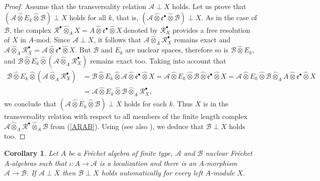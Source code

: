 \documentclass[12pt]{amsart}%
\theoremstyle{plain}
\newtheorem{corollary}{Corollary}
\numberwithin{equation}{section}
\numberwithin{equation}{section}
\numberwithin{theorem}{section}
\numberwithin{lemma}{section}
\numberwithin{remark}{section}
\numberwithin{example}{section}
\numberwithin{proposition}{section}
\numberwithin{definition}{section}
\numberwithin{corollary}{section}
\begin{document}
\begin{proof}
Assume that the transversality relation $\mathcal{A}\perp X$ holds. Let us
prove that $\left(  \mathcal{A}\widehat{\otimes}E_{k}\widehat{\otimes
}\mathcal{B}\right)  \perp X$ holds for all $k$, that is, $\left(
\mathcal{A}\widehat{\otimes}\mathfrak{e}^{\bullet}\widehat{\otimes}%
\mathcal{B}\right)  \perp X$. As in the case of $\mathcal{B}$, the complex
$\mathcal{R}^{\bullet}\widehat{\otimes}_{A}X=A\widehat{\otimes}\mathfrak{e}%
^{\bullet}\widehat{\otimes}X\mathcal{\ }$denoted by $\mathcal{R}_{X}^{\bullet
}$ provides a free resolution of $X$ in $A$-mod. Since $\mathcal{A}\perp X$,
it follows that $\mathcal{A}\widehat{\otimes}_{A}\mathcal{R}_{X}^{\bullet}$
remains exact and $\mathcal{A}\widehat{\otimes}_{A}\mathcal{R}_{X}^{\bullet
}=\mathcal{A}\widehat{\otimes}\mathfrak{e}^{\bullet}\widehat{\otimes}X$. But
$\mathcal{B}$ and $E_{k}$ are nuclear spaces, therefore so is $\mathcal{B}%
\widehat{\otimes}E_{k}$, and $\mathcal{B}\widehat{\otimes}E_{k}%
\widehat{\otimes}\left(  \mathcal{A}\widehat{\otimes}_{A}\mathcal{R}%
_{X}^{\bullet}\right)  $ remains exact too. Taking into account that
\begin{align*}
\mathcal{B}\widehat{\otimes}E_{k}\widehat{\otimes}\left(  \mathcal{A}%
\widehat{\otimes}_{A}\mathcal{R}_{X}^{\bullet}\right)   &  =\mathcal{B}%
\widehat{\otimes}E_{k}\widehat{\otimes}\mathcal{A}\widehat{\otimes
}\mathfrak{e}^{\bullet}\widehat{\otimes}X=\mathcal{A}\widehat{\otimes}%
E_{k}\widehat{\otimes}\mathcal{B}\widehat{\otimes}\mathfrak{e}^{\bullet
}\widehat{\otimes}X=\mathcal{A}\widehat{\otimes}E_{k}\widehat{\otimes
}\mathcal{B}\widehat{\otimes}_{A}A\widehat{\otimes}\mathfrak{e}^{\bullet
}\widehat{\otimes}X\\
&  =\mathcal{A}\widehat{\otimes}E_{k}\widehat{\otimes}\mathcal{B}%
\widehat{\otimes}_{A}\mathcal{R}_{X}^{\bullet},
\end{align*}
we conclude that $\left(  \mathcal{A}\widehat{\otimes}E_{k}\widehat{\otimes
}\mathcal{B}\right)  \perp X$ holds for each $k$. Thus $X$ is in the
transversality relation with respect to all members of the finite length
complex $\mathcal{A}\widehat{\otimes}_{A}\mathcal{R}^{\bullet}\widehat{\otimes
}_{A}\mathcal{B}$ from (\ref{ARAB}). Using \cite[Proposition 2.4]{Tay2} (see
also \cite[Corollary 3.1.16]{EP}), we deduce that $\mathcal{B}\perp X$ holds too.
\end{proof}

\begin{corollary}
\label{corDom12}Let $A$ be a Fr\'{e}chet algebra of finite type, $\mathcal{A}$
and $\mathcal{B}$ nuclear Fr\'{e}chet $A$-algebras such that $\iota
:A\rightarrow\mathcal{A}$ is a localization and there is an $A$-morphism
$\mathcal{A\rightarrow B}$. If $\mathcal{A}\perp X$ then $\mathcal{B}\perp X$
holds automatically for every left $A$-module $X$.
\end{corollary}
\end{document}
